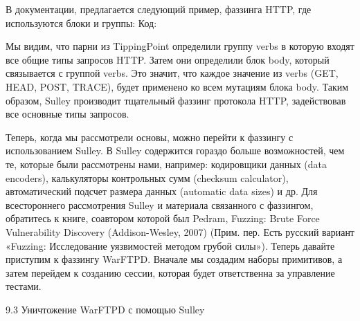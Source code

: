 \documentclass[12pt, a4paper, oneside]{book}
\begin{document}
В документации, предлагается следующий пример, фаззинга HTTP, где используются блоки и группы:
Код:







Мы видим, что парни из TippingPoint определили группу verbs в которую входят все общие типы запросов HTTP. Затем они определили блок body, который связывается с группой verbs. Это значит, что каждое значение из verbs (GET, HEAD, POST, TRACE), будет применено ко всем мутациям блока body. Таким образом, Sulley производит тщательный фаззинг протокола HTTP, задействовав все основные типы запросов. 

Теперь, когда мы рассмотрели основы, можно перейти к фаззингу с использованием Sulley. В Sulley содержится гораздо больше возможностей, чем те, которые были рассмотрены нами, например: кодировщики данных (data encoders), калькуляторы контрольных сумм (checksum calculator), автоматический подсчет размера данных (automatic data sizes) и др. Для всестороннего рассмотрения Sulley и материала связанного с фаззингом, обратитесь к книге, соавтором которой был Pedram, Fuzzing: Brute Force Vulnerability Discovery (Addison-Wesley, 2007) (Прим. пер. Есть русский вариант «Fuzzing: Исследование уязвимостей методом грубой силы»). Теперь давайте приступим к фаззингу WarFTPD. Вначале мы создадим наборы примитивов, а затем перейдем к созданию сессии, которая будет ответственна за управление тестами. 


9.3 Уничтожение WarFTPD с помощью Sulley
\end{document}
